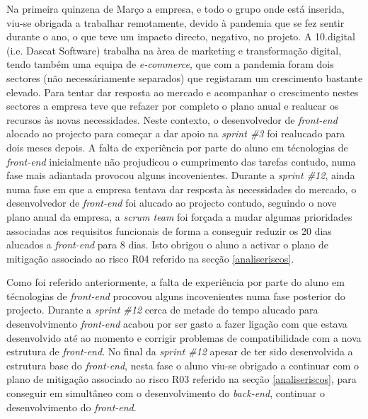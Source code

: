 Na primeira quinzena de Março a empresa, e todo o grupo onde está inserida, viu-se obrigada a trabalhar remotamente, devido à pandemia que se fez sentir durante o ano, o que teve um impacto directo, negativo, no projeto. A 10.digital (i.e. Dascat Software) trabalha na àrea de marketing e transformação digital, tendo também uma equipa de \textit{e-commerce}, que com a pandemia foram dois sectores (não necessáriamente separados) que registaram um crescimento bastante elevado. 
Para tentar dar resposta ao mercado e acompanhar o crescimento nestes sectores a empresa teve que refazer por completo o plano anual e realucar os recursos às novas necessidades. 
Neste contexto, o desenvolvedor de \textit{front-end} alocado ao projecto para começar a dar apoio na \textit{sprint \#3} foi realucado para dois meses depois. A falta de experiência por parte do aluno em técnologias de \textit{front-end} inicialmente não projudicou o cumprimento das tarefas contudo, numa fase mais adiantada provocou alguns incovenientes. 
Durante a \textit{sprint \#12}, ainda numa fase em que a empresa tentava dar resposta às necessidades do mercado, o desenvolvedor de \textit{front-end} foi alucado ao projecto contudo, seguindo o nove plano anual da empresa, a \textit{scrum team} foi forçada a mudar algumas prioridades associadas aos requisitos funcionais de forma a conseguir reduzir os 20 dias alucados a \textit{front-end} para 8 dias. Isto obrigou o aluno a activar o plano de mitigação associado ao risco R04 referido na secção \ref{analiseriscos}. 

Como foi referido anteriormente, a falta de experiência por parte do aluno em técnologias de \textit{front-end} procovou alguns incovenientes numa fase posterior do projecto. Durante a \textit{sprint \#12} cerca de metade do tempo alucado para desenvolvimento \textit{front-end} acabou por ser gasto a fazer ligação com que estava desenvolvido até ao momento e corrigir problemas de compatibilidade com a nova estrutura de \textit{front-end}. No final da \textit{sprint \#12} apesar de ter sido desenvolvida a estrutura base do \textit{front-end}, nesta fase o aluno viu-se obrigado a continuar com o plano de mitigação associado ao risco R03 referido na secção \ref{analiseriscos}, para conseguir em simultâneo com o desenvolvimento do \textit{back-end}, continuar o desenvolvimento do \textit{front-end}.






\blankpage

\glsresetall
